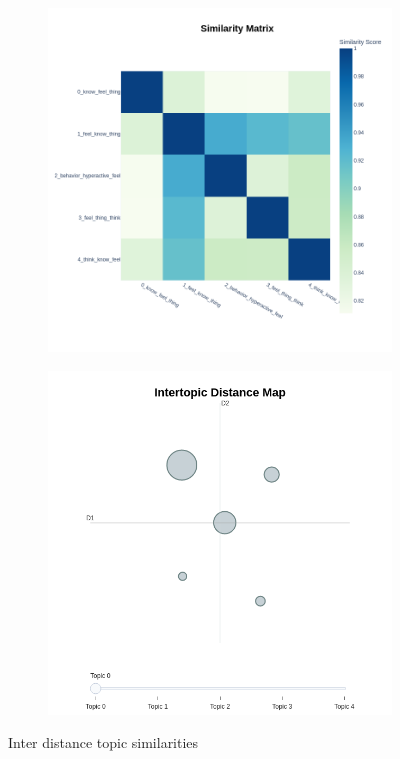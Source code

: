 \documentclass[sn-mathphys,Numbered]{sn-jnl}%
\theoremstyle{thmstyleone}%
\theoremstyle{thmstyletwo}%
\theoremstyle{thmstylethree}%
\begin{document}
\begin{figure}[h!]
\centering
\begin{subfigure}{0.45\textwidth}
    \includegraphics[width=\textwidth]{bertopic/combined_bertopic_topics_heatmap_frequency.png}
    \label{redditdist}
\end{subfigure}
\hfill
\begin{subfigure}{0.45\textwidth}
    \includegraphics[width=\textwidth]{bertopic/combined_bertopic_topics_map_frequency.png}
    \label{twitterdist}
\end{subfigure}   
\caption{Inter distance topic similarities}
\label{redditdist_twitterdist}
\end{figure}
\end{document}
